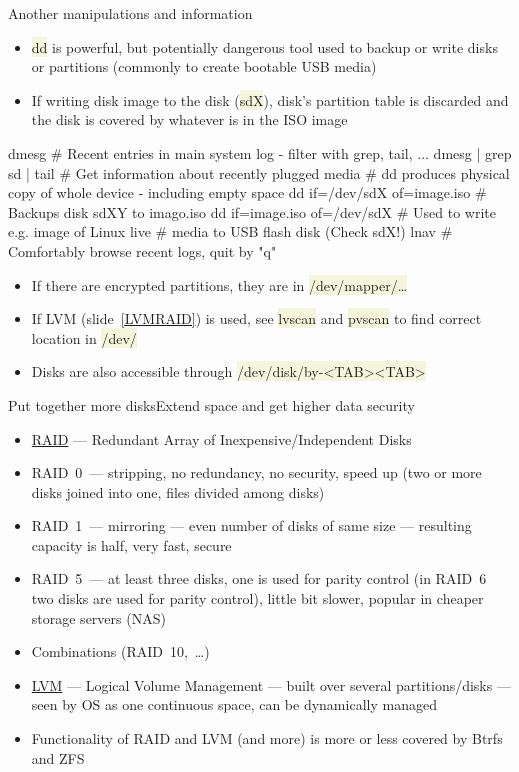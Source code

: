 \documentclass[compress, xelatex, 11pt, xcolor=svgnames, aspectratio=169,
	hyperref={
		bookmarks=true,
		unicode=true,
		colorlinks=true,
		pdftitle={Linux, command line and MetaCentrum},
		plainpages=false,
		pdfauthor={Vojtech Zeisek},
		pdfsubject={Course about use of Linux command line, writing shell scripts and using MetaCentrum of CESNET},
		pdfcreator={XeLaTeX},
		pdfkeywords={Linux, GNU, BASH, shell, command line, MetaCentrum},
		linkcolor=DarkRed, %
		anchorcolor=DarkBlue, %
		citecolor=Indigo, %
		filecolor=NavyBlue, %
		menucolor=DarkMagenta, %
		urlcolor=DarkBlue, %
		},
	url={hyphens, lowtilde} %
	]{beamer}
\renewcommand{\texttt}[1]{\colorbox{Beige}{{\ttfamily #1}}}
\begin{document}
\begin{frame}[fragile]{Another manipulations and information}
	\begin{itemize}
		\item \texttt{dd} is powerful, but potentially dangerous tool used to backup or write disks or partitions (commonly to create bootable USB media)
		\item If writing disk image to the disk (\texttt{sdX}), disk's partition table is discarded and the disk is covered by whatever is in the ISO image
	\end{itemize}
	\begin{bashcode}
    dmesg # Recent entries in main system log - filter with grep, tail, ...
    dmesg | grep sd | tail # Get information about recently plugged media
    # dd produces physical copy of whole device - including empty space
    dd if=/dev/sdX of=image.iso # Backups disk sdXY to imago.iso
    dd if=image.iso of=/dev/sdX # Used to write e.g. image of Linux live
                                # media to USB flash disk (Check sdX!)
    lnav # Comfortably browse recent logs, quit by "q"
	\end{bashcode}
	\begin{itemize}
		\item If there are encrypted partitions, they are in \texttt{/dev/mapper/\ldots}
		\item If LVM (slide~\ref{LVMRAID}) is used, see \texttt{lvscan} and \texttt{pvscan} to find correct location in \texttt{/dev/}
		\item Disks are also accessible through \texttt{/dev/disk/by-<TAB><TAB>}
	\end{itemize}
\end{frame}

\begin{frame}{Put together more disks}{Extend space and get higher data security}
	\label{LVMRAID}
	\begin{itemize}
		\item \href{https://en.wikipedia.org/wiki/RAID}{RAID} --- Redundant Array of Inexpensive/Independent Disks
		\item RAID~0~--- stripping, no redundancy, no security, speed up (two or more disks joined into one, files divided among disks)
		\item RAID~1~--- mirroring --- even number of disks of same size --- resulting capacity is half, very fast, secure
		\item RAID~5~--- at least three disks, one is used for parity control (in RAID~6 two disks are used for parity control), little bit slower, popular in cheaper storage servers (NAS)
		\item Combinations (RAID~10,~\ldots)
		\item \href{https://en.wikipedia.org/wiki/Logical_volume_management}{LVM} --- Logical Volume Management --- built over several partitions/disks --- seen by OS as one continuous space, can be dynamically managed
		\item Functionality of RAID and LVM (and more) is more or less covered by Btrfs and ZFS
	\end{itemize}
\end{frame}
\end{document}
